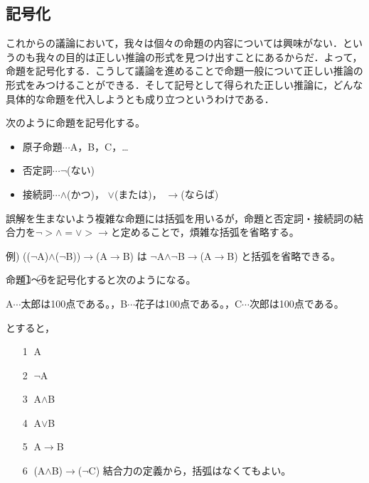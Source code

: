 \documentclass[10pt,b5paper,papersize,dvipdfmx]{jsbook}
\begin{document}
\subsection{記号化}
これからの議論において，我々は個々の命題の内容については興味がない．というのも我々の目的は正しい推論の形式を見つけ出すことにあるからだ．よって，命題を記号化する．こうして議論を進めることで命題一般について正しい推論の形式をみつけることができる．そして記号として得られた正しい推論に，どんな具体的な命題を代入しようとも成り立つというわけである．\par
次のように命題を記号化する。
\begin{itemize}
\item 原子命題$\cdots$A，B，C，\dots
\item 否定詞$\cdots$$\lnot$(ない)
\item 接続詞$\cdots$$\land$(かつ)， $\lor$(または)， $\to$(ならば)
\end{itemize}
誤解を生まないよう複雑な命題には括弧を用いるが，命題と否定詞・接続詞の結合力を$\lnot>\land=\lor>\to$と定めることで，煩雑な括弧を省略する。\par
例) (($\lnot$A)$\land$($\lnot$B))$\to$(A$\to$B) は $\lnot$A$\land$$\lnot$B$\to$(A$\to$B) と括弧を省略できる。\par
命題\textcircled{\scriptsize 1}～\textcircled{\scriptsize 6}を記号化すると次のようになる。\par
A$\cdots$太郎は100点である。，B$\cdots$花子は100点である。，C$\cdots$次郎は100点である。\par
とすると，
\begin{itemize}
\item[\textcircled{\scriptsize 1}]A
\item[\textcircled{\scriptsize 2}]$\lnot$A
\item[\textcircled{\scriptsize 3}]A$\land$B
\item[\textcircled{\scriptsize 4}]A$\lor$B
\item[\textcircled{\scriptsize 5}]A$\to$B
\item[\textcircled{\scriptsize 6}](A$\land$B)$\to$($\lnot$C) 結合力の定義から，括弧はなくてもよい。
\end{itemize}
\end{document}
